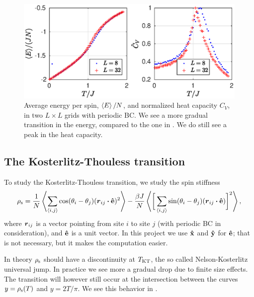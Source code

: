 \documentclass[11pt,letter, swedish, english
]{article}
\begin{document}
\begin{figure}
\centering
\includegraphics[width=1\textwidth]{XY_ECV_L-8-32_Nsteps-64.eps}
\caption{Average energy per spin, $\ev{E}/N$, and normalized heat
  capacity $C_V$, in two $L\times L$ grids with periodic BC. We see a
  more gradual transition in the energy, compared to the one in
  . We do still see a peak in the heat capacity.} 
\label{fig:ECV2}
\end{figure}


\subsection{The Kosterlitz-Thouless transition}



To study the Kosterlitz-Thouless transition, we study the spin
stiffness
\begin{equation}\label{eq:rhos}
\rhos = \frac{1}{N}\ev{\sum_{\ev{i, j}}\cos(\theta_i - \theta_j)
(\vb*r_{ij}\vdot\vu{e})^2}
-\frac{\beta J}{N}
   \ev{\bigg[\sum_{\ev{i, j}}\sin(\theta_i - \theta_j)
       (\vb*r_{ij}\vdot\vu{e})\bigg]^2},
\end{equation}
where $\vb*r_{ij}$ is a vector pointing from site $i$ to site $j$
(with periodic BC in consideration), and $\vu{e}$ is a unit vector. In
this project we use $\vu{x}$ and $\vu{y}$ for $\vu{e}$; that is not
necessary, but it makes the computation easier. 

In theory $\rho_{\text{s}}$ should have a discontinuity at $T_{\text{KT}}$, the so called
Nelson-Kosterlitz universal jump. In practice we see more a gradual
drop due to finite size effects. The transition will however still
occur at the intersection between the curves $y=\rho_{\text{s}}(T)$ and
$y=2T/\pi$. We see this behavior in . 
\end{document}

